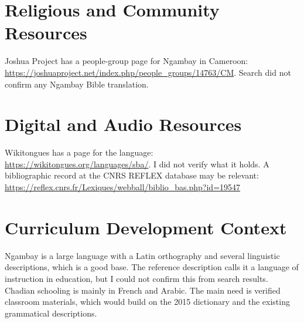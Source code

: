 \documentclass[12pt]{article}
\begin{document}
\section{Religious and Community Resources}
Joshua Project has a people-group page for Ngambay in Cameroon: \url{https://joshuaproject.net/index.php/people_groups/14763/CM}. Search did not confirm any Ngambay Bible translation.

\section{Digital and Audio Resources}
Wikitongues has a page for the language: \url{https://wikitongues.org/languages/sba/}. I did not verify what it holds. A bibliographic record at the CNRS REFLEX database may be relevant: \url{https://reflex.cnrs.fr/Lexiques/webball/biblio_bas.php?id=19547}

\section{Curriculum Development Context}
Ngambay is a large language with a Latin orthography and several linguistic descriptions, which is a good base. The reference description calls it a language of instruction in education, but I could not confirm this from search results. Chadian schooling is mainly in French and Arabic. The main need is verified classroom materials, which would build on the 2015 dictionary and the existing grammatical descriptions.
\end{document}
